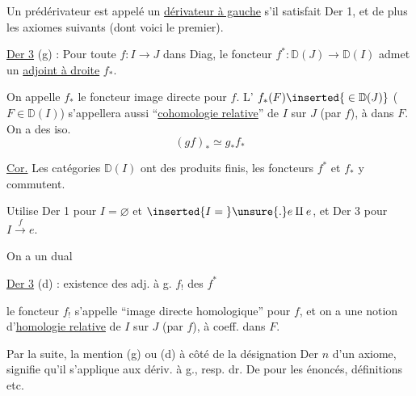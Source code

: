 Un prédérivateur est appelé un \uline{dérivateur à gauche} s'il satisfait Der 1, et de plus  les axiomes suivants (dont voici le premier).

\uline{Der 3} (g) : Pour toute $f:I\to J$ dans Diag, le foncteur $f^*:\mathbb D(J)\to\mathbb D(I)$ admet un \uline{adjoint à droite} $f_*$.

On appelle $f_*$ le foncteur image directe  pour $f$. L' $f_*(F)\inserted{{}\in\mathbb D(J)}$ ($F\in\mathbb D(I)$) s'appellera aussi   ``\uline{cohomologie relative}'' de $I$ sur $J$ (par $f$), à  dans $F$. On a des iso. 
\[
 (gf)_*\simeq g_*f_*
\]

\uline{Cor.} Les catégories $\mathbb D(I)$ ont des produits finis, les foncteurs $f^*$ et $f_*$ y commutent.

Utilise Der 1  pour $I=\varnothing$ et $\inserted{I={}}\unsure{.}e\amalg e$, et Der 3 pour $I\xrightarrow{f}e$.

On a un   dual

\uline{Der 3} (d) : existence des adj. à g. $f_!$ des $f^*$

le foncteur $f_!$ s'appelle ``image directe homologique'' pour $f$, et on a une notion d'\uline{homologie relative} de $I$ sur $J$ (par $f$), à coeff. dans $F$.

Par la suite, la mention (g) ou (d) à côté de la désignation Der $n$ d'un axiome, signifie qu'il s'applique aux dériv. à g., resp.  dr. De  pour les énoncés, définitions etc.
